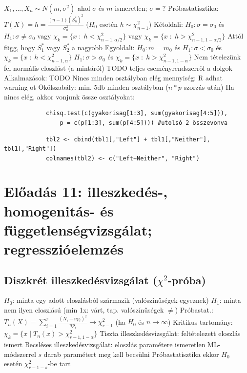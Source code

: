 \documentclass[12pt,a4paper]{article}
\begin{document}
\begin{outline}
	\1 $X_1,...,X_n \sim N(m,\sigma^2)$ ahol $\sigma$ és $m$ ismeretlen; $\sigma=?$
	\1 Próbastatisztika: $T(X) = h = \frac{(n-1)(S^*_n)^2}{\sigma_0^2}$
	\;\; ($H_0$ esetén $h \sim \chi^2_{n-1}$)
	\1 Kétoldali: $H_0: \sigma = \sigma_0$ és $H_1: \sigma \ne \sigma_0$
		\2 vagy $\chi_k = \{ x \;:\; h < \chi^2_{n-1,\alpha/2} \}$
		\2 vagy $\chi_k = \{ x \;:\; h > \chi^2_{n-1,1-\alpha/2} \}$
		\2 Attól függ, hogy $S_1^*$ vagy $S_2^*$ a nagyobb
	\1 Egyoldali: $H_0: m = m_0$ és 
		\2 $H_1: \sigma < \sigma_0$ és $\chi_k = \{ x \;:\; h < \chi^2_{n-1,\alpha} \}$
		\2 $H_1: \sigma > \sigma_0$ és $\chi_k = \{ x \;:\; h > \chi^2_{n-1,1-\alpha} \}$
	\1 Nem tételezünk fel normális eloszlást (a mintáról)
	\1 TODO teljes eseményrendszerről a dolgok
	\1 Alkalmazások: TODO
	\1 Nincs minden osztályban elég mennyiség: R adhat warning-ot
		\2 Ökölszabály: min. 5db minden osztályban ($n*p$ szorzás után)
		\2 Ha nincs elég, akkor vonjunk össze osztályokat:
			\3 \begin{verbatim}
			chisq.test(c(gyakorisag[1:3], sum(gyakorisag[4:5])),
			    p = c(p[1:3], sum(p[4:5]))) #utolsó 2 összevonva\end{verbatim}
			\3 \begin{verbatim}
			tbl2 <- cbind(tbl1[,"Left"] + tbl1[,"Neither"], tbl1[,"Right"])
			colnames(tbl2) <- c("Left+Neither", "Right")\end{verbatim}
\end{outline}

\pagebreak

\section{Előadás 11: illeszkedés-, homogenitás- és\\
függetlenségvizsgálat; regresszióelemzés}

\subsection{Diszkrét illeszkedésvizsgálat ($\chi^2$-próba)}

\begin{outline}
	\1 $H_0$: minta egy adott eloszlásból származik (valószínűségek egyeznek)
	\1 $H_1$: minta nem ilyen eloszlású (min 1x: várt, tap. valószínűségek $\ne$)
	\2 Próbastat.: $T_n(X) = \sum_{i=1}^{r} \frac{(N_i - np_i)^2}{np_i} \to \chi^2_{r-1}$
	(ha $H_0$ és $n \to \infty$)
	\2 Kritikus tartomány: $\chi_k = \{ x \;|\; T_n(x) > \chi^2_{r-1,1-\alpha} \}$
	\1 Tiszta illeszkedésvizsgálat: feltételezett eloszlás ismert
	\1 Becsléses illeszkedésvizsgálat: eloszlás paramétere ismeretlen
		\2 ML-módszerrel $s$ darab paramétert meg kell becsülni
		\2 Próbastatisztika ekkor $H_0$ esetén $\chi^2_{r-1-s}$-be tart
\end{outline}
\end{document}
